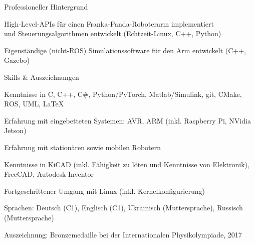 \documentclass[12pt]{article} %
\begin{document}
\begin{ItemizeSection}{Professioneller Hintergrund}
    \item {}
    \begin{ItemizeSubsection}
        \item High-Level-APIs für einen Franka-Panda-Roboterarm implementiert \\ und Steuerungsalgorithmen entwickelt (Echtzeit-Linux, C++, Python)
        \item Eigenständige (nicht-ROS) Simulationssoftware für den Arm entwickelt (C++, Gazebo)
    \end{ItemizeSubsection}
\end{ItemizeSection}

\begin{ItemizeSection}{Skills \& Auszeichnungen}
    \item Kenntnisse in C, C++, C\#, Python/PyTorch, Matlab/Simulink, git, CMake, ROS, UML, \LaTeX

    \item Erfahrung mit eingebetteten Systemen: AVR, ARM (inkl. Raspberry Pi, NVidia Jetson)

    \item Erfahrung mit stationären sowie mobilen Robotern

    \item Kenntnisse in KiCAD (inkl. Fähigkeit zu löten und Kenntnisse von Elektronik), FreeCAD, Autodesk Inventor

    \item Fortgeschrittener Umgang mit Linux (inkl. Kernelkonfigurierung)

    \item Sprachen: Deutsch (C1), Englisch (C1), Ukrainisch (Muttersprache), Russisch (Muttersprache)

    \item Auszeichnung: Bronzemedaille bei der Internationalen Physikolympiade, 2017
\end{ItemizeSection}


\end{document}
